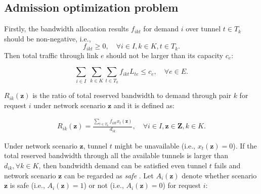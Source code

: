 \documentclass[sigconf]{acmart}
\begin{document}
 



\clearpage

\begin{appendices}
 \section{Admission optimization problem} \label{admission_problem}
 
Firstly, the bandwidth allocation results $f_{ikt}$ for demand $i$ over tunnel $t \in T_{k}$ should be non-negative, i.e.,
\begin{equation}
f_{ikt} \ge 0, \quad\forall i \in I ,  k\in K,   t\in T_{k}.
\label{constraint-f}
\end{equation}
Then total traffic through link $e$ should not be larger than its capacity $c_e$:

\begin{equation}
 \sum_{i \in I}\ \sum_{k\in K}\sum_{t\in T_{k}}f_{ikt}L_{te} \le c_e, \quad \forall e \in E.
\label{constraint-e}
\end{equation}


$R_{ik}(\bm{z})$ is the ratio of total reserved bandwidth to demand through pair $k$ for request $i$ under network scenario $\bm{z}$ and it is  defined as:

 \begin{eqnarray} \label{R}
R_{ik}(\bm{z})=\frac{\sum_{t\in T_{k}}f_{ikt}x_t(\bm{z}) }{d_{ik}}, \quad \forall  i \in I, \bm{z}\in \bm{Z}, k \in K.
\end{eqnarray}

Under network scenario $\bm{z}$, tunnel $t$ might be unavailable (i.e., $x_t(\bm{z}) =0$).
If the total reserved bandwidth through all the available tunnels is larger than $d_{ik}, \forall k \in K$,  then bandwidth demand can be satisfied even tunnel $t$ fails and network scenario $\bm{z}$ can be regarded as \textit{safe} .
Let $A_i(\bm{z})$ denote whether scenario $\bm{z}$ is safe (i.e., $A_i(\bm{z})=1$) or not (i.e., $A_i(\bm{z})=0$) for request $i$:


\end{appendices}
\end{document}
